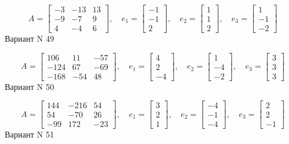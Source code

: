 \documentclass[11pt]{report}
\begin{document}
$$A = \left[\begin{matrix}-3 & -13 & 13\\-9 & -7 & 9\\4 & -4 & 6\end{matrix}\right],\quad e_1 = \left[\begin{matrix}-1\\-1\\2\end{matrix}\right],\quad e_2 = \left[\begin{matrix}1\\1\\2\end{matrix}\right],\quad e_3 = \left[\begin{matrix}1\\-1\\-2\end{matrix}\right]$$Вариант N 49

$$A = \left[\begin{matrix}106 & 11 & -57\\-124 & 67 & -69\\-168 & -54 & 48\end{matrix}\right],\quad e_1 = \left[\begin{matrix}4\\2\\-4\end{matrix}\right],\quad e_2 = \left[\begin{matrix}1\\-4\\-2\end{matrix}\right],\quad e_3 = \left[\begin{matrix}3\\3\\3\end{matrix}\right]$$Вариант N 50

$$A = \left[\begin{matrix}144 & -216 & 54\\54 & -70 & 26\\-99 & 172 & -23\end{matrix}\right],\quad e_1 = \left[\begin{matrix}3\\2\\1\end{matrix}\right],\quad e_2 = \left[\begin{matrix}-4\\-1\\-4\end{matrix}\right],\quad e_3 = \left[\begin{matrix}2\\2\\-1\end{matrix}\right]$$Вариант N 51
\end{document}
